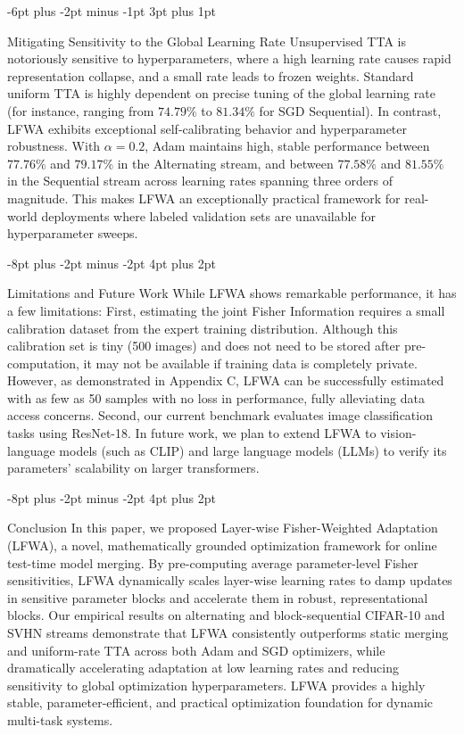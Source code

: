 \documentclass{article}
\makeatletter
\theoremstyle{plain}
\theoremstyle{definition}
\theoremstyle{remark}
\renewcommand{\section}{\@startsection{section}{1}{\z@}%
                       {-8pt plus -2pt minus -2pt}%
                       {4pt plus 2pt}%
                       {\normalfont\large\bfseries\raggedright}}
\renewcommand{\subsection}{\@startsection{subsection}{2}{\z@}%
                          {-6pt plus -2pt minus -1pt}%
                          {3pt plus 1pt}%
                          {\normalfont\normalsize\bfseries\raggedright}}
\makeatother
\begin{document}
\subsection{Mitigating Sensitivity to the Global Learning Rate}
Unsupervised TTA is notoriously sensitive to hyperparameters, where a high learning rate causes rapid representation collapse, and a small rate leads to frozen weights. Standard uniform TTA is highly dependent on precise tuning of the global learning rate (for instance, ranging from $74.79\%$ to $81.34\%$ for SGD Sequential). 
In contrast, LFWA exhibits exceptional self-calibrating behavior and hyperparameter robustness. With $\alpha=0.2$, Adam maintains high, stable performance between $77.76\%$ and $79.17\%$ in the Alternating stream, and between $77.58\%$ and $81.55\%$ in the Sequential stream across learning rates spanning three orders of magnitude. This makes LFWA an exceptionally practical framework for real-world deployments where labeled validation sets are unavailable for hyperparameter sweeps.


\section{Limitations and Future Work}
\label{sec:limitations}
While LFWA shows remarkable performance, it has a few limitations:
First, estimating the joint Fisher Information requires a small calibration dataset from the expert training distribution. Although this calibration set is tiny (500 images) and does not need to be stored after pre-computation, it may not be available if training data is completely private. However, as demonstrated in Appendix C, LFWA can be successfully estimated with as few as 50 samples with no loss in performance, fully alleviating data access concerns.
Second, our current benchmark evaluates image classification tasks using ResNet-18. In future work, we plan to extend LFWA to vision-language models (such as CLIP) and large language models (LLMs) to verify its parameters' scalability on larger transformers.

\section{Conclusion}
\label{sec:conclusion}
In this paper, we proposed Layer-wise Fisher-Weighted Adaptation (LFWA), a novel, mathematically grounded optimization framework for online test-time model merging. By pre-computing average parameter-level Fisher sensitivities, LFWA dynamically scales layer-wise learning rates to damp updates in sensitive parameter blocks and accelerate them in robust, representational blocks. 
Our empirical results on alternating and block-sequential CIFAR-10 and SVHN streams demonstrate that LFWA consistently outperforms static merging and uniform-rate TTA across both Adam and SGD optimizers, while dramatically accelerating adaptation at low learning rates and reducing sensitivity to global optimization hyperparameters. 
LFWA provides a highly stable, parameter-efficient, and practical optimization foundation for dynamic multi-task systems.
\end{document}
